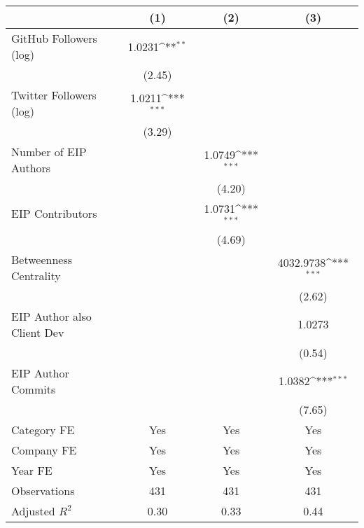 {
\def\sym#1{\ifmmode^{#1}\else\(^{#1}\)\fi}
\begin{tabular}{l*{3}{c}}
\hline\hline
                                   &\multicolumn{1}{c}{(1)}         &\multicolumn{1}{c}{(2)}         &\multicolumn{1}{c}{(3)}         \\
\hline
GitHub Followers (log)             &      1.0231\sym{**} &                     &                     \\
                                   &      (2.45)         &                     &                     \\
[1em]
Twitter Followers (log)            &      1.0211\sym{***}&                     &                     \\
                                   &      (3.29)         &                     &                     \\
[1em]
Number of EIP Authors              &                     &      1.0749\sym{***}&                     \\
                                   &                     &      (4.20)         &                     \\
[1em]
EIP Contributors                   &                     &      1.0731\sym{***}&                     \\
                                   &                     &      (4.69)         &                     \\
[1em]
Betweenness Centrality             &                     &                     &   4032.9738\sym{***}\\
                                   &                     &                     &      (2.62)         \\
[1em]
EIP Author also Client Dev         &                     &                     &      1.0273         \\
                                   &                     &                     &      (0.54)         \\
[1em]
EIP Author Commits                 &                     &                     &      1.0382\sym{***}\\
                                   &                     &                     &      (7.65)         \\
[1em]
Category FE                        &         Yes         &         Yes         &         Yes         \\
[1em]
Company FE                         &         Yes         &         Yes         &         Yes         \\
[1em]
Year FE                            &         Yes         &         Yes         &         Yes         \\
\hline
Observations                       &         431         &         431         &         431         \\
Adjusted \(R^{2}\)                 &        0.30         &        0.33         &        0.44         \\
\hline\hline
\end{tabular}
}
